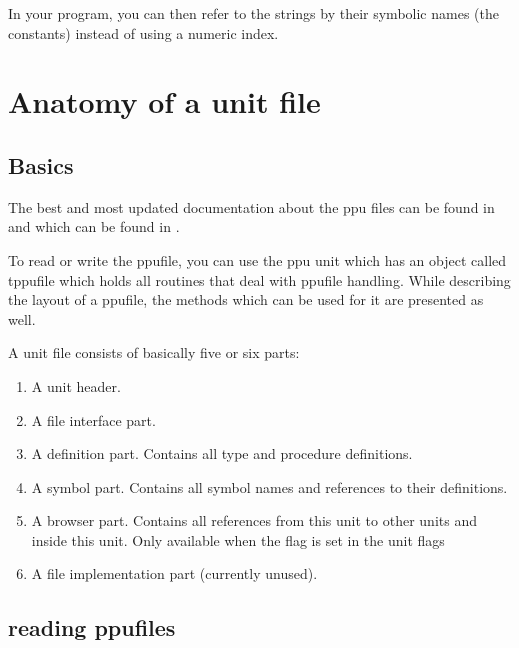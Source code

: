 In your program, you can then refer to the strings by their symbolic
names (the constants) instead of using a numeric index.

\appendix


\chapter{Anatomy of a unit file}
\label{ch:AppA}

\section{Basics}

The best and most updated documentation about the ppu files can be
found in  and  which can be found in
.

To read or write the ppufile, you can use the ppu unit 
which has an object called tppufile which holds all routines that deal
with ppufile handling. While describing the layout of a ppufile, the
methods which can be used for it are presented as well.

A unit file consists of basically five or six parts:
\begin{enumerate}
\item A unit header.
\item A file interface part.
\item A definition part. Contains all type and procedure definitions.
\item A symbol part. Contains all symbol names and references to their
definitions.
\item A browser part. Contains all references from this unit to other
units and inside this unit. Only available when the  flag is
set in the unit flags
\item A file implementation part (currently unused).
\end{enumerate}

\section{reading ppufiles}

